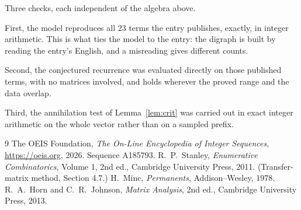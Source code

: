 \documentclass[11pt,a4paper]{article}
\theoremstyle{plain}
\theoremstyle{definition}
\begin{document}
Three checks, each independent of the algebra above.

First, the model reproduces all $23$ terms the entry publishes, exactly, in integer
arithmetic. This is what ties the model to the entry: the digraph is built by reading the
entry's English, and a misreading gives different counts.

Second, the conjectured recurrence was evaluated directly on those published terms, with no
matrices involved, and holds wherever the proved range and the data overlap.

Third, the annihilation test of Lemma~\ref{lem:crit} was carried out in exact integer
arithmetic on the whole vector rather than on a sampled prefix.

\begin{thebibliography}{9}
 The OEIS Foundation, \emph{The On-Line Encyclopedia of Integer
Sequences}, \url{https://oeis.org}, 2026. Sequence A185793.
 R.~P.~Stanley, \emph{Enumerative Combinatorics}, Volume 1, 2nd ed.,
Cambridge University Press, 2011. (Transfer-matrix method, Section 4.7.)
 H.~Minc, \emph{Permanents}, Addison--Wesley, 1978.
 R.~A.~Horn and C.~R.~Johnson, \emph{Matrix Analysis}, 2nd ed., Cambridge
University Press, 2013.
\end{thebibliography}
\end{document}
